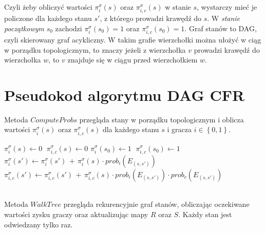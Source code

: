 \documentclass[magisterska]{pracamgr}
\begin{document}
\noindent
Czyli żeby obliczyć wartości $\pi_i^{\sigma}(s)$ oraz $\pi_{i, c}^{\sigma}(s)$ w stanie $s$, wystarczy
mieć je policzone dla każdego stanu $s'$, z którego prowadzi krawędź do $s$. W \emph{stanie początkowym} $s_0$ zachodzi
$\pi_i^{\sigma}(s_0) = 1$ oraz $\pi_{i, c}^{\sigma}(s_0) = 1$. Graf stanów to DAG, czyli
skierowany graf acykliczny. W takim grafie wierzchołki można ułożyć w ciąg w porządku topologicznym, to znaczy
jeżeli z wierzchołka $v$ prowadzi krawędź do wierzchołka $w$, to $v$ znajduje się w ciągu przed wierzchołkiem $w$.

\section{Pseudokod algorytmu DAG CFR}

\noindent
Metoda $ComputeProbs$ przegląda stany w porządku topologicznym i oblicza wartości $\pi_i^{\sigma}(s)$ oraz $\pi_{i, c}^{\sigma}(s)$
dla każdego stanu $s$ i gracza $i \in \left\{0, 1\right\}$. \\ 

\begin{algorithmic}
        \State $\pi_i^{\sigma}(s) \gets 0$ $ \; \pi_{i,c}^{\sigma}(s) \gets 0$
        \State $\pi_i^{\sigma}(s_0) \gets 1$ $ \; \pi_{i,c}^{\sigma}(s_0) \gets 1$
                \State $\pi_i^{\sigma}(s') \gets \pi_i^{\sigma}(s') \, + \, \pi_i^{\sigma}(s) \cdot prob_i(E_{(s, s')})$ 
                \State $\pi_{i,c}^{\sigma}(s') \gets \pi_{i,c}^{\sigma}(s') \, + \, \pi_{i,c}^{\sigma}(s) \cdot prob_i(E_{(s, s')}) \cdot prob_c(E_{(s, s')})$ 
            \EndFor
        \EndFor
    \EndFunction
\end{algorithmic}

$\,$ \\

\noindent
Metoda $WalkTree$ przegląda rekurencyjnie graf stanów, obliczając oczekiwane wartości zysku graczy oraz
aktualizując mapy $R$ oraz $S$. Każdy stan jest odwiedzany tylko raz. \\
\end{document}
